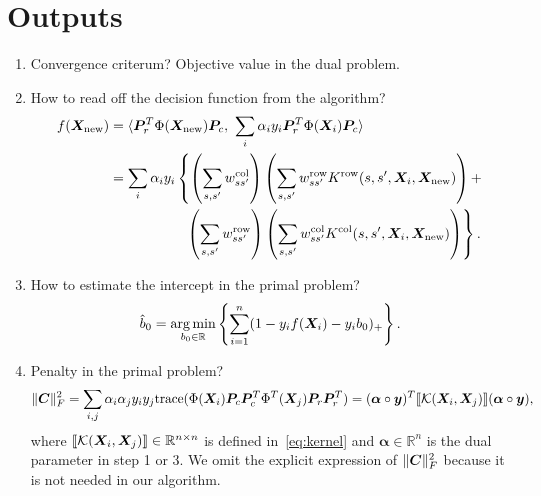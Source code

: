 \documentclass[11pt]{article}
\theoremstyle{plain}
\theoremstyle{definition}
\newcommand*{\KeepStyleUnderBrace}[1]{%
  \mathop{%
    \mathchoice
    {\underbrace{\displaystyle#1}}%
    {\underbrace{\textstyle#1}}%
    {\underbrace{\scriptstyle#1}}%
    {\underbrace{\scriptscriptstyle#1}}%
  }\limits
}
\begin{document}
\section{Outputs}
\begin{enumerate}
\item Convergence criterum? Objective value in the dual problem.

\item How to read off the decision function from the algorithm?
\begin{align}\label{eq:function}
f(\bm X_{\text{new}}) &=\langle  \bm{P}^T_r\Phi(\bm X_{\text{new}})\bm{P}_c, \ \sum_i\alpha_iy_i\bm{P}^T_r\Phi(\bm X_i)\bm{P}_c\rangle \notag \\
&=\sum_i \alpha_i y_i \left\{ \left(\sum_{s,s'}w^{\text{col}}_{ss'}\right)\left(\sum_{s,s'}w^{\text{row}}_{ss'}K^{\text{row}}(s,s',\bm X_i,\bm X_{\text{new}})\right)+\right.\notag \\
&\quad\quad\quad\quad\quad\ \left. \left(\sum_{s,s'}w^{\text{row}}_{ss'}\right)\left(\sum_{s,s'}w^{\text{col}}_{ss'}K^{\text{col}}(s,s',\bm X_i,\bm X_{\text{new}})\right)\right\}.
\end{align}

\item How to estimate the intercept in the primal problem?
\[
\hat b_0=\operatorname*{arg\,min}_{b_0\in\mathbb{R}}\left\{\sum_{i=1}^n(1-y_if(\bm X_i)-y_ib_0)_{+}\right\}.
\]

\item Penalty in the primal problem?
\[
\lVert\bm C\rVert_F^2=\sum_{i,j}\alpha_i\alpha_jy_iy_j\text{trace}(\Phi(\bm X_i)\bm{P}_c\bm{P}^T_c\Phi^T(\bm X_j)\bm{P}_r\bm{P}^T_r) = 
(\boldsymbol{\alpha}\circ \bm{y})^T\llbracket \mathcal{K}(\bm X_i,\bm X_j) \rrbracket(\boldsymbol{\alpha}\circ \bm{y}),
\]
where $\llbracket \mathcal{K}(\bm X_i,\bm X_j) \rrbracket\in\mathbb{R}^{n\times n}$ is defined in~\eqref{eq:kernel} and $\boldsymbol{\alpha}\in\mathbb{R}^n$ is the dual parameter in step 1 or 3. We omit the explicit expression of $\lVert\bm C\rVert_F^2$ because it is not needed in our algorithm. 

\end{enumerate}
\end{document}
